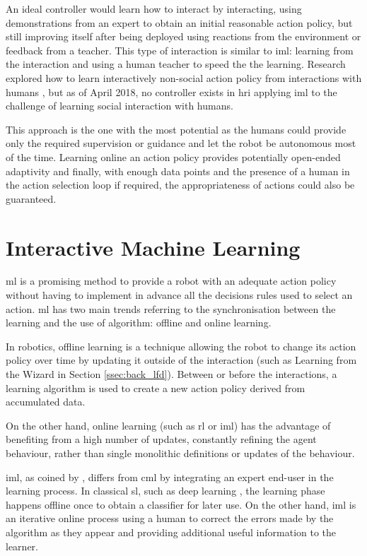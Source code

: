 	An ideal controller would learn how to interact by interacting, using demonstrations from an expert to obtain an initial reasonable action policy, but still improving itself after being deployed using reactions from the environment or feedback from a teacher. This type of interaction is similar to \gls{iml}: learning from the interaction and using a human teacher to speed the the learning. Research explored how to learn interactively non-social action policy from interactions with humans \citep{scheutz2017spoken,cakmak2010designing}, but as of April 2018, no controller exists in \gls{hri} applying \gls{iml} to the challenge of learning social interaction with humans. 

	This approach is the one with the most potential as the humans could provide only the required supervision or guidance and let the robot be autonomous most of the time. Learning online an action policy provides potentially open-ended adaptivity and finally, with enough data points and the presence of a human in the action selection loop if required, the appropriateness of actions could also be guaranteed.
	
\section{Interactive Machine Learning} \label{sec:back_iml}

\gls{ml} is a promising method to provide a robot with an adequate action policy without having to implement in advance all the decisions rules used to select an action. \gls{ml} has two main trends referring to the synchronisation between the learning and the use of algorithm: offline and online learning.

In robotics, offline learning is a technique allowing the robot to change its action policy over time by updating it outside of the interaction (such as Learning from the Wizard in Section \ref{ssec:back_lfd}). Between or before the interactions, a learning algorithm is used to create a new action policy derived from accumulated data.

On the other hand, online learning (such as \gls{rl} or \gls{iml}) has the advantage of benefiting from a high number of updates, constantly refining the agent behaviour, rather than single monolithic definitions or updates of the behaviour. 

\acrfull{iml}, as coined by \cite{fails2003interactive}, differs from \gls{cml} by integrating an expert end-user in the learning process. In classical \gls{sl}, such as deep learning \citep{lecun2015deep}, the learning phase happens offline once to obtain a classifier for later use. On the other hand, \gls{iml} is an iterative online process using a human to correct the errors made by the algorithm as they appear and providing additional useful information to the learner.

